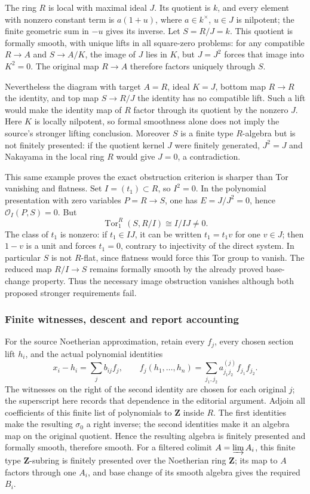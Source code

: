The ring \(R\) is local with maximal ideal \(J\). Its quotient is \(k\), and every element with nonzero constant term is \(a(1+u)\), where \(a\in k^\times\), \(u\in J\) is nilpotent; the finite geometric sum in \(-u\) gives its inverse. Let \(S=R/J=k\). This quotient is formally smooth, with unique lifts in all square-zero problems: for any compatible \(R\to A\) and \(S\to A/K\), the image of \(J\) lies in \(K\), but \(J=J^2\) forces that image into \(K^2=0\). The original map \(R\to A\) therefore factors uniquely through \(S\).

Nevertheless the diagram with target \(A=R\), ideal \(K=J\), bottom map \(R\to R\) the identity, and top map \(S\to R/J\) the identity has no compatible lift. Such a lift would make the identity map of \(R\) factor through its quotient by the nonzero \(J\). Here \(K\) is locally nilpotent, so formal smoothness alone does not imply the source's stronger lifting conclusion. Moreover \(S\) is a finite type \(R\)-algebra but is not finitely presented: if the quotient kernel \(J\) were finitely generated, \(J^2=J\) and Nakayama in the local ring \(R\) would give \(J=0\), a contradiction.

This same example proves the exact obstruction criterion is sharper than Tor vanishing and flatness. Set \(I=(t_1)\subset R\), so \(I^2=0\). In the polynomial presentation with zero variables \(P=R\to S\), one has \(E=J/J^2=0\), hence \(\mathcal O_I(P,S)=0\). But \[
\operatorname{Tor}_1^R(S,R/I)\cong I/IJ\ne0.
\] The class of \(t_1\) is nonzero: if \(t_1\in IJ\), it can be written \(t_1=t_1v\) for one \(v\in J\); then \(1-v\) is a unit and forces \(t_1=0\), contrary to injectivity of the direct system. In particular \(S\) is not \(R\)-flat, since flatness would force this Tor group to vanish. The reduced map \(R/I\to S\) remains formally smooth by the already proved base-change property. Thus the necessary image obstruction vanishes although both proposed stronger requirements fail.

\subsubsection{Finite witnesses, descent and report accounting}\label{algebra-proof-048-finite-witnesses-descent-and-report-accounting}

For the source Noetherian approximation, retain every \(f_j\), every chosen section lift \(h_i\), and the actual polynomial identities \[
x_i-h_i=\sum_j b_{ij}f_j,\qquad
f_j(h_1,\ldots,h_n)=\sum_{j_1,j_2}a^{(j)}_{j_1j_2}f_{j_1}f_{j_2}.
\] The witnesses on the right of the second identity are chosen for each original \(j\); the superscript here records that dependence in the editorial argument. Adjoin all coefficients of this finite list of polynomials to \(\mathbf Z\) inside \(R\). The first identities make the resulting \(\sigma_0\) a right inverse; the second identities make it an algebra map on the original quotient. Hence the resulting algebra is finitely presented and formally smooth, therefore smooth. For a filtered colimit \(A=\varinjlim A_i\), this finite type \(\mathbf Z\)-subring is finitely presented over the Noetherian ring \(\mathbf Z\); its map to \(A\) factors through one \(A_i\), and base change of its smooth algebra gives the required \(B_i\).

